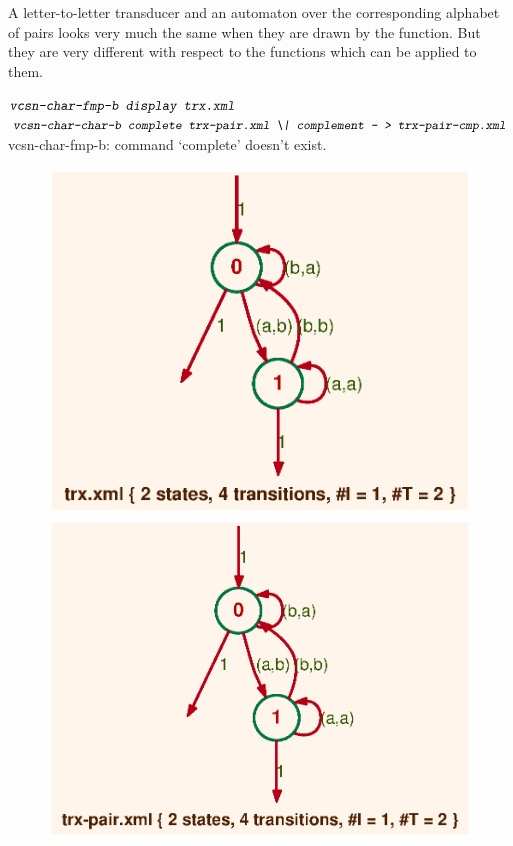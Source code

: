 \Comt
A letter-to-letter transducer and an automaton over the corresponding 
alphabet of pairs looks very much the same when they are drawn 
by the  function. 
But they are very different with respect to the functions which can 
be applied to them.

\begin{shell}
$ \textsl{\texttt{vcsn-char-fmp-b display trx.xml}}
$ 
$ \kbd{vcsn-char-char-b complete trx-pair.xml \bslash| complement - > trx-pair-cmp.xml}
$ 
vcsn-char-fmp-b: command `complete' doesn't exist.
\end{shell}%

\begin{figure}[ht]
    \centering
\includegraphics[scale=0.4]{figures/trx.ps}
\PushLine 
\includegraphics[scale=0.4]{figures/trx-pair.ps}

\end{figure}
